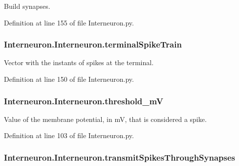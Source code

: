 Build synapses. 



Definition at line 155 of file Interneuron.\+py.

\subsubsection[{\texorpdfstring{terminal\+Spike\+Train}{terminalSpikeTrain}}]{\setlength{\rightskip}{0pt plus 5cm}Interneuron.\+Interneuron.\+terminal\+Spike\+Train}\hypertarget{class_interneuron_1_1_interneuron_aa345954910a8c7b304d0c18b53f20480}{}\label{class_interneuron_1_1_interneuron_aa345954910a8c7b304d0c18b53f20480}


Vector with the instants of spikes at the terminal. 



Definition at line 150 of file Interneuron.\+py.

\subsubsection[{\texorpdfstring{threshold\+\_\+mV}{threshold_mV}}]{\setlength{\rightskip}{0pt plus 5cm}Interneuron.\+Interneuron.\+threshold\+\_\+mV}\hypertarget{class_interneuron_1_1_interneuron_a0e69e0be9f68e8099f5cde10e0b1bea1}{}\label{class_interneuron_1_1_interneuron_a0e69e0be9f68e8099f5cde10e0b1bea1}


Value of the membrane potential, in mV, that is considered a spike. 



Definition at line 103 of file Interneuron.\+py.

\subsubsection[{\texorpdfstring{transmit\+Spikes\+Through\+Synapses}{transmitSpikesThroughSynapses}}]{\setlength{\rightskip}{0pt plus 5cm}Interneuron.\+Interneuron.\+transmit\+Spikes\+Through\+Synapses}\hypertarget{class_interneuron_1_1_interneuron_a045e133d9975922a3f6865c01cfd6dbb}{}\label{class_interneuron_1_1_interneuron_a045e133d9975922a3f6865c01cfd6dbb}


